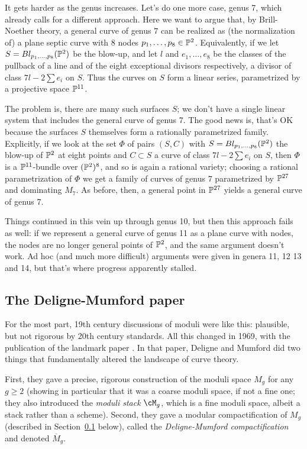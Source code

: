 It gets harder as the genus increases. Let's do one more case, genus 7, which already calls for a different approach. Here we want to argue that, by Brill-Noether theory, a general curve of genus $7$ can be realized as (the normalization of) a plane septic curve with 8 nodes $p_1,\dots,p_8 \in \PP^2$. Equivalently, if we let $S = Bl_{p_1,\dots,p_8}(\PP^2)$ be the blow-up, and let $l$ and $e_1,\dots,e_8$ be the classes of the pullback of a line and of the eight exceptional divisors respectively, a divisor of class $7l - 2 \sum e_i$ on $S$. Thus the curves on $S$ form a linear series, parametrized by a projective space $\PP^{11}$.

The problem is, there are many such surfaces $S$; we don't have a single linear system that includes the general curve of genus 7. The good news is, that's OK because the surfaces $S$ themselves form a rationally parametrized family. Explicitly, if we look at the set $\Phi$ of pairs $(S, C)$ with $S = Bl_{p_1,\dots,p_8}(\PP^2)$  the blow-up of $\PP^2$ at eight points and $C \subset S$ a curve of class $7l - 2 \sum e_i$ on $S$, then $\Phi$ is a $\PP^{11}$-bundle over $(\PP^2)^8$, and so is again a rational variety; choosing a rational parametrization of $\Phi$ we get a family of curves of genus $7$ parametrized by $\PP^{27}$ and dominating $M_7$. As before, then, a general point in $\PP^{27}$ yields a general curve of genus 7.

Things continued in this vein up through genus 10, but then this approach fails as well: if we represent a general curve of genus 11 as a plane curve with nodes, the nodes are no longer general points of $\PP^2$, and the same argument doesn't work. Ad hoc (and much more difficult) arguments were given in genera 11, 12 13 and 14, but that's where progress apparently stalled.


\subsection{The Deligne-Mumford paper}

For the most part, 19th century discussions of moduli were like this: plausible, but not rigorous by 20th century standards. All this changed in 1969, with the publication of the landmark paper \cite{Deligne-Mumford}. In that paper, Deligne and Mumford did two things that fundamentally altered the landscape of curve theory. 

First, they gave a precise, rigorous construction of the moduli space $M_g$ for any $g \geq 2$ (showing in particular that it was a coarse moduli space, if not a fine one; they also introduced the \emph{moduli stack} $\cM_g$, which is a fine moduli space, albeit a stack rather than a scheme). Second, they gave a modular compactification of $M_g$ (described in Section~\ref{} below), called the \emph{Deligne-Mumford compactification} and denoted $\overline M_g$. 

